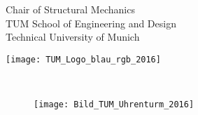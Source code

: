 \thispagestyle{empty}
\newlength{\headsepold}
\setlength{\headsepold}{\headsep}
\setlength{\headsep}{-1.26cm}
\begin{center}
{\sffamily
\fontsize{18}{18}\selectfont 
\begin{minipage}[b]{120mm}
{
\small \textcolor{tum_blau_2016}{Chair of Structural Mechanics \\
TUM School of Engineering and Design \\
Technical University of Munich}
}
\end{minipage}
 \hfill \texttt{[image: TUM\_Logo\_blau\_rgb\_2016]}
\vspace{0.5cm}

}
\end{center}
\vspace{3cm}
{\sffamily
\begin{doublespace} %
{\huge{\textbf{\veranstaltung}}}%
\end{doublespace}
\Large \lehrer 
\ifdef{\assistent}{\\[.1cm] \normalsize \assistent}{}
\\[.9cm]
\large \semester %
}

\enlargethispage{3.5cm}
\vspace{2cm}
\begin{figure}[h]
\begin{addmargin}{-2cm}
\flushright
\texttt{[image: Bild\_TUM\_Uhrenturm\_2016]}%
\end{addmargin}
\end{figure}
\vfill
\restoregeometry
\newpage
\setlength{\headsep}{\headsepold}
